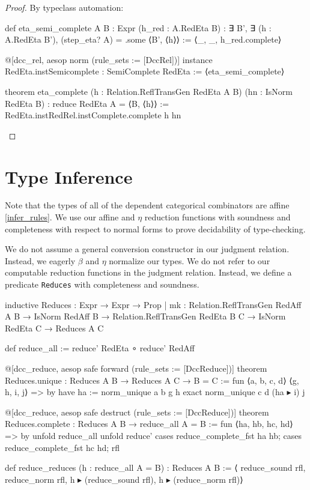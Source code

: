 \documentclass{article}
\begin{document}
\begin{proof}
  By typeclass automation:
\begin{leancode}


def eta_semi_complete {A B : Expr} (h_red : A.RedEta B) :
  ∃ B', ∃ (h : A.RedEta B'), (step_eta? A) = .some ⟨B', ⟨h⟩⟩ :=
  ⟨_, _, h_red.complete⟩

@[dcc_rel, aesop norm (rule_sets := [DccRel])] instance RedEta.instSemicomplete : SemiComplete RedEta := ⟨eta_semi_complete⟩

theorem eta_complete (h : Relation.ReflTransGen RedEta A B)
  (hn : IsNorm RedEta B) : reduce RedEta A = ⟨B, ⟨h⟩⟩ :=
  RedEta.instRedRel.instComplete.complete h hn
\end{leancode}
\end{proof}


\section{Type Inference}

Note that the types of all of the dependent categorical combinators are affine \eqref{infer_rules}. We use our affine and \(\eta\) reduction functions with soundness and completeness with respect to normal forms to prove decidability of type-checking.

We do not assume a general conversion constructor in our judgment relation. Instead, we eagerly \(\beta\) and \(\eta\) normalize our types. We do not refer to our computable reduction functions in the judgment relation. Instead, we define a predicate \texttt{Reduces} with completeness and soundness.

\begin{leancode}
inductive Reduces : Expr → Expr → Prop
  | mk : Relation.ReflTransGen RedAff A B
    → IsNorm RedAff B
    → Relation.ReflTransGen RedEta B C
    → IsNorm RedEta C
    → Reduces A C

def reduce_all := reduce' RedEta ∘ reduce' RedAff

@[dcc_reduce, aesop safe forward (rule_sets := [DccReduce])]
theorem Reduces.unique : Reduces A B → Reduces A C → B = C := fun ⟨a, b, c, d⟩ ⟨g, h, i, j⟩ => by
  have ha := norm_unique a b g h
  exact norm_unique c d (ha ▸ i) j

@[dcc_reduce, aesop safe destruct (rule_sets := [DccReduce])]
theorem Reduces.complete : Reduces A B → reduce_all A = B :=
  fun ⟨ha, hb, hc, hd⟩ => by
    unfold reduce_all
    unfold reduce'
    cases reduce_complete_fst ha hb; cases reduce_complete_fst hc hd; rfl

def reduce_reduces (h : reduce_all A = B) : Reduces A B := ⟨
  reduce_sound rfl,
  reduce_norm rfl,
  h ▸ (reduce_sound rfl),
  h ▸ (reduce_norm rfl)⟩
\end{leancode}
\end{document}
